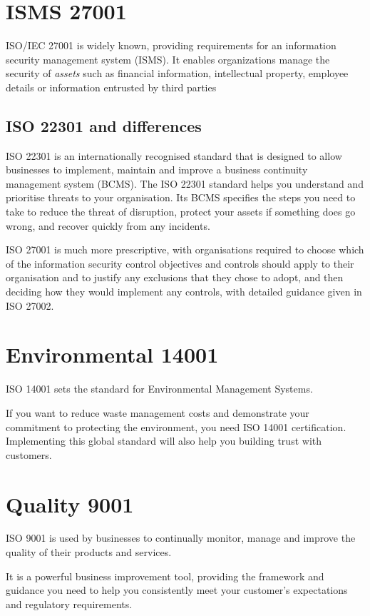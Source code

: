 \documentclass[a4paper,12pt]{article}
\begin{document}
\section{ISMS 27001 }

ISO/IEC 27001 is widely known, providing requirements for an information security management system (ISMS).
It enables organizations manage the security of  \emph{assets} such as financial information, intellectual property, employee details or information entrusted by third parties

\subsection{ISO 22301 and differences}

ISO 22301 is an internationally recognised standard that is designed to allow businesses to implement, maintain and improve a business continuity management system (BCMS). The ISO 22301 standard helps you understand and prioritise threats to your organisation. Its BCMS specifies the steps you need to take to reduce the threat of disruption, protect your assets if something does go wrong, and recover quickly from any incidents.

ISO 27001 is much more prescriptive, with organisations required to choose which of the
information security control objectives and controls should apply to their organisation and to justify
any exclusions that they chose to adopt, and then deciding how they would implement any controls,
with detailed guidance given in ISO 27002.


\section{Environmental 14001}
ISO 14001 sets the standard for Environmental Management Systems.

If you want to reduce waste management costs and demonstrate your commitment to protecting the environment, you need ISO 14001 certification. Implementing this global standard will also help you building trust with customers.

\section{Quality 9001}
ISO 9001 is used by businesses to continually monitor, manage and improve the quality of their products and services.

It is a powerful business improvement tool, providing the framework and guidance you need to help you consistently meet your customer’s expectations and regulatory requirements.
\end{document}
